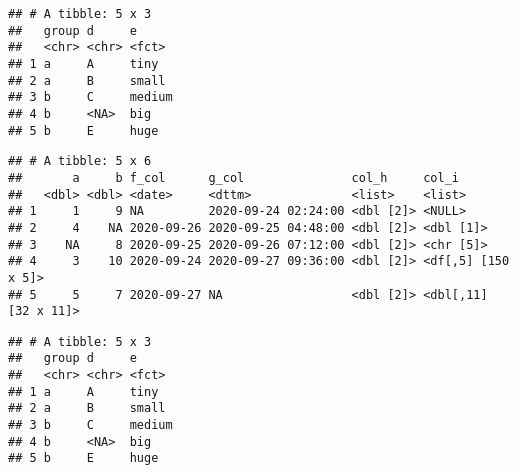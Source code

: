 \documentclass[
]{book}
\newenvironment{Shaded}{\begin{snugshade}}{\end{snugshade}}
\newcommand{\KeywordTok}[1]{\textcolor[rgb]{0.13,0.29,0.53}{\textbf{#1}}}
\newcommand{\NormalTok}[1]{#1}
\newcommand{\OperatorTok}[1]{\textcolor[rgb]{0.81,0.36,0.00}{\textbf{#1}}}
\newcommand{\StringTok}[1]{\textcolor[rgb]{0.31,0.60,0.02}{#1}}
\begin{document}
\begin{Shaded}
\end{Shaded}

\begin{verbatim}
## # A tibble: 5 x 3
##   group d     e     
##   <chr> <chr> <fct> 
## 1 a     A     tiny  
## 2 a     B     small 
## 3 b     C     medium
## 4 b     <NA>  big   
## 5 b     E     huge
\end{verbatim}

\begin{Shaded}
\end{Shaded}

\begin{verbatim}
## # A tibble: 5 x 6
##       a     b f_col      g_col               col_h     col_i               
##   <dbl> <dbl> <date>     <dttm>              <list>    <list>              
## 1     1     9 NA         2020-09-24 02:24:00 <dbl [2]> <NULL>              
## 2     4    NA 2020-09-26 2020-09-25 04:48:00 <dbl [2]> <dbl [1]>           
## 3    NA     8 2020-09-25 2020-09-26 07:12:00 <dbl [2]> <chr [5]>           
## 4     3    10 2020-09-24 2020-09-27 09:36:00 <dbl [2]> <df[,5] [150 x 5]>  
## 5     5     7 2020-09-27 NA                  <dbl [2]> <dbl[,11] [32 x 11]>
\end{verbatim}

\begin{Shaded}
\end{Shaded}

\begin{verbatim}
## # A tibble: 5 x 3
##   group d     e     
##   <chr> <chr> <fct> 
## 1 a     A     tiny  
## 2 a     B     small 
## 3 b     C     medium
## 4 b     <NA>  big   
## 5 b     E     huge
\end{verbatim}
\end{document}
